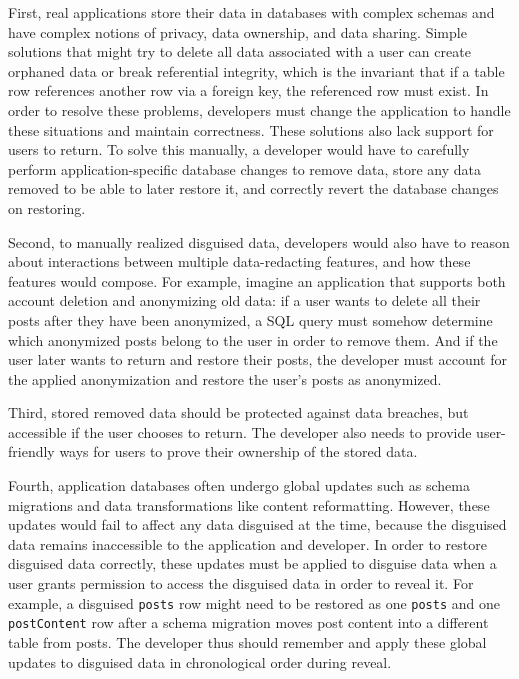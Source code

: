 %
First, real applications store their data in databases with complex schemas and have
complex notions of privacy, data ownership, and data sharing.
%
Simple solutions that might try to delete all data associated with a user can
create orphaned data or break referential integrity, which is the invariant that if a
table row references another row via a foreign key, the referenced row must
exist. 
%
In order to resolve these problems, developers must change the application to
handle these situations and maintain correctness. These solutions also lack
support for users to return.
%
To solve this manually, a developer would have to carefully perform
application-specific database changes to remove data, store any data removed to
be able to later restore it, and correctly revert the database changes on
restoring.
%

%
Second, to manually realized disguised data, developers would also have to
reason about interactions between multiple data-redacting features, and how
these features would compose.
%
For example, imagine an application that supports both account deletion and
anonymizing old data: if a user wants to delete all their posts after they have
been anonymized, a SQL query must somehow determine which anonymized posts
belong to the user in order to remove them.
%
And if the user later wants to return and restore their posts, the developer
must account for the applied anonymization and restore the user's posts as
anonymized.
%

%
Third, stored removed data should be protected against data breaches, but 
accessible if the user chooses to return. The developer also needs to provide
user-friendly ways for users to prove their ownership of the stored data.
%

%
Fourth, application databases often undergo global updates such as schema
migrations and data transformations like content reformatting. However, these
updates would fail to affect any data disguised at the time, because the
disguised data remains inaccessible to the application and developer.  In order
to restore disguised data correctly, these updates must be applied to disguise
data when a user grants permission to access the disguised data in order to
reveal it.
%
For example, a disguised \texttt{posts} row might need to be restored as one 
\texttt{posts} and one \texttt{postContent} row after a schema migration
moves post content into a different table from posts. 
%
The developer thus should remember and apply these global updates to disguised
data in chronological order during reveal.
%


